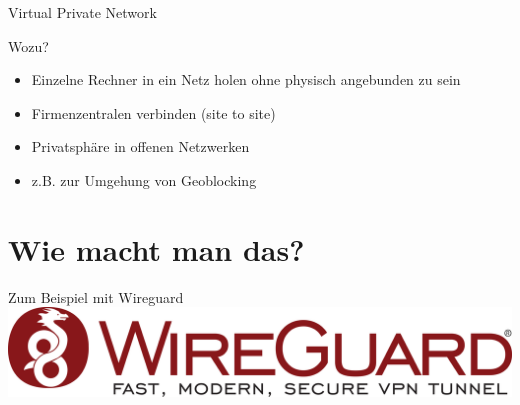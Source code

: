\documentclass{beamer}
\begin{document}
  {
    \begin{frame}{Virtual Private Network}
    \end{frame}
  }

  \begin{frame}{Wozu?}
    \begin{itemize}[<+->]
      \item Einzelne Rechner in ein Netz holen ohne physisch angebunden zu sein
      \item Firmenzentralen verbinden (site to site)
      \item Privatsphäre in offenen Netzwerken
      \item {} z.B. zur Umgehung von Geoblocking
    \end{itemize}
  \end{frame}


  \section{Wie macht man das?}

  \begin{frame}{Zum Beispiel mit Wireguard}
    \includegraphics[width=\textwidth]{wireguard}
  \end{frame}
\end{document}
